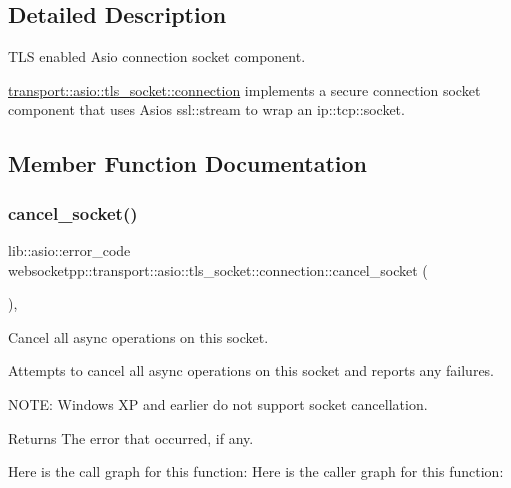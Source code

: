\subsection{Detailed Description}
T\+LS enabled Asio connection socket component. 

\mbox{\hyperlink{classwebsocketpp_1_1transport_1_1asio_1_1tls__socket_1_1connection}{transport\+::asio\+::tls\+\_\+socket\+::connection}} implements a secure connection socket component that uses Asio\textquotesingle{}s ssl\+::stream to wrap an ip\+::tcp\+::socket. 

\subsection{Member Function Documentation}
\mbox{\label{classwebsocketpp_1_1transport_1_1asio_1_1tls__socket_1_1connection_af1fb297f14e4d010ce4a7aa352509611}} 
\subsubsection{\texorpdfstring{cancel\+\_\+socket()}{cancel\_socket()}}
{\footnotesize\ttfamily lib\+::asio\+::error\+\_\+code websocketpp\+::transport\+::asio\+::tls\+\_\+socket\+::connection\+::cancel\+\_\+socket (\begin{DoxyParamCaption}{ }\end{DoxyParamCaption})\hspace{0.3cm}{\ttfamily [inline]}, {\ttfamily [protected]}}



Cancel all async operations on this socket. 

Attempts to cancel all async operations on this socket and reports any failures.

N\+O\+TE\+: Windows XP and earlier do not support socket cancellation.

\begin{DoxyReturn}{Returns}
The error that occurred, if any. 
\end{DoxyReturn}
Here is the call graph for this function\+:
Here is the caller graph for this function\+:
\mbox{\label{classwebsocketpp_1_1transport_1_1asio_1_1tls__socket_1_1connection_a5105586ade9ca6e016f308b0aebfcb3c}} 
